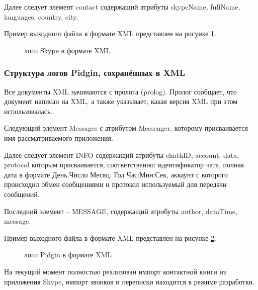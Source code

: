 Далее следует элемент contact содержащий атрибуты skypeName, fullName, languages, country, city.

Пример выходного файла в формате XML представлен на рисунке \ref{pic:log_skype}.
  
\begin{figure}[h]
\caption{логи Skype в формате XML}
\label{pic:log_skype}
\end{figure}

\subsubsection{Структура логов Pidgin, сохранённых в XML}

Все документы XML начинаются с пролога (prolog). Пролог сообщает, что документ написан на XML, а также указывает, какая версия XML при этом использовалась.  

Следующий элемент Messages с атрибутом Messenger, которому присваивается имя рассматриваемого приложения.

Далее следует элемент INFO содержащий атрибуты chathID, account, data, protocol которым присваивается, соответственно: идентификатор чата, полная дата в формате День.Число Месяц. Год Час:Мин:Сек, аккаунт с которого происходил обмен сообщениями и протокол используемый для передачи сообщений. 

Последний элемент -- MESSAGE, содержащий атрибуты author, dataTime, message.

Пример выходного файла в формате XML представлен на рисунке \ref{pic:log_pidgin}.

\begin{figure}[h]
\caption{логи Pidgin в формате XML}
\label{pic:log_pidgin}
\end{figure}

На текущий момент полностью реализован импорт контактной книги из приложения Skype, импорт звонков и переписки находится в режиме разработки.
